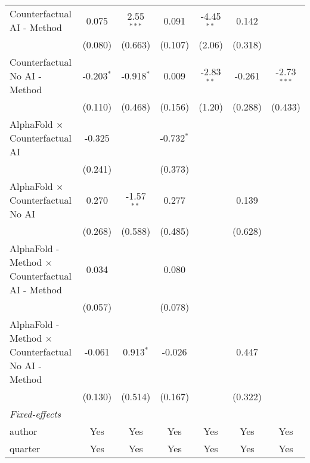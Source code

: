 \begin{tabular}{lcccccc}
   Counterfactual AI - Method                                 & 0.075        & 2.55$^{***}$  & 0.091        & -4.45$^{**}$ & 0.142   &   \\   
                                                              & (0.080)      & (0.663)       & (0.107)      & (2.06)       & (0.318) &   \\   
   Counterfactual No AI - Method                              & -0.203$^{*}$ & -0.918$^{*}$  & 0.009        & -2.83$^{**}$ & -0.261  & -2.73$^{***}$\\   
                                                              & (0.110)      & (0.468)       & (0.156)      & (1.20)       & (0.288) & (0.433)\\   
   AlphaFold $\times$ Counterfactual AI                       & -0.325       &               & -0.732$^{*}$ &              &         &   \\   
                                                              & (0.241)      &               & (0.373)      &              &         &   \\   
   AlphaFold $\times$ Counterfactual No AI                    & 0.270        & -1.57$^{**}$  & 0.277        &              & 0.139   &   \\   
                                                              & (0.268)      & (0.588)       & (0.485)      &              & (0.628) &   \\   
   AlphaFold - Method $\times$ Counterfactual AI - Method     & 0.034        &               & 0.080        &              &         &   \\   
                                                              & (0.057)      &               & (0.078)      &              &         &   \\   
   AlphaFold - Method $\times$ Counterfactual No AI - Method  & -0.061       & 0.913$^{*}$   & -0.026       &              & 0.447   &   \\   
                                                              & (0.130)      & (0.514)       & (0.167)      &              & (0.322) &   \\   
   \midrule
   \emph{Fixed-effects}\\
   author                                                     & Yes          & Yes           & Yes          & Yes          & Yes     & Yes\\  
   quarter                                                    & Yes          & Yes           & Yes          & Yes          & Yes     & Yes\\  

\end{tabular}
